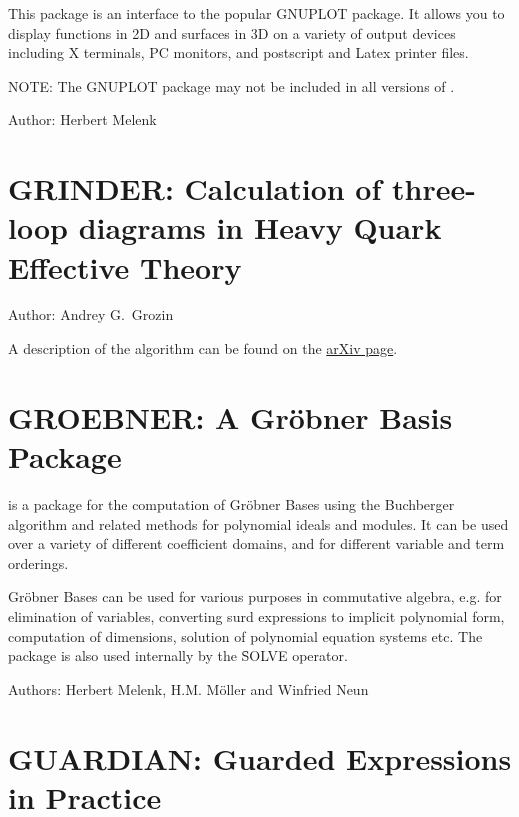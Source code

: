 This package is an interface to the popular GNUPLOT package.
It allows you to display functions in 2D and surfaces in 3D
on a variety of output devices including X terminals, PC monitors, and
postscript and Latex printer files.

NOTE: The GNUPLOT package may not be included in all versions of \REDUCE.

Author: Herbert Melenk


\fi

\newpage

\section{GRINDER: Calculation of three-loop diagrams in Heavy Quark Effective Theory}
\label{GRINDER}

Author: Andrey G.~Grozin

A description of the algorithm can be found on the \href{https://arxiv.org/abs/hep-ph/0002266}{arXiv page}.

\newpage

\section{GROEBNER: A Gr\"{o}bner Basis Package}
\label{GROEBNER}

 is a package for the computation of Gr\"obner
Bases using the Buchberger algorithm and related methods
for polynomial ideals and modules.  It can be used over a variety of
different coefficient domains, and for different variable and term
orderings.

Gr\"obner Bases can be used for various purposes in commutative
algebra, e.g. for elimination of variables,
converting surd expressions to implicit polynomial form,
computation of dimensions, solution of polynomial equation systems
 etc.
The package is also used internally by the \f{SOLVE}
operator.

Authors: Herbert Melenk, H.M. M\"oller and Winfried Neun



\newpage

\section{GUARDIAN: Guarded Expressions in Practice}
\label{GUARDIAN}

